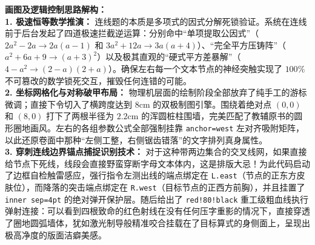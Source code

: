 \vspace{0.4cm}
{\small\color{blue!70!black}
\textbf{画图及逻辑控制思路解构：}\\
\textbf{1. 极速恒等数学推演：} 连线题的本质是多项式的因式分解死锁验证。系统在连线前于后台发起了四道极速拦截逆运算：分别命中“单项提取公因式”（$2a^2 - 2a \rightarrow 2a(a - 1)$ 和 $3a^2 + 12a \rightarrow 3a(a + 4)$）、“完全平方压铸阵”（$a^2 + 6a + 9 \rightarrow (a+3)^2$）以及极其直观的“硬式平方差暴解”（$4 - a^2 \rightarrow (2-a)(2+a)$）。确保左右每一个文本节点的神经突触实现了 $100\%$ 不可篡改的数学锁死交互，摧毁任何连错的可能。\\
\textbf{2. 坐标网格化与对称破甲布局：} 物理机层面的绘制阶段全部放弃了纯手工的游标微调；直接下令切入了横跨度达到 $8\mathrm{cm}$ 的双极制图引擎。围绕着绝对点 $(0,0)$ 和 $(8,0)$ 打下了两根半径为 $2.2\mathrm{cm}$ 的浑圆桩柱围墙，完美匹配了教辅原书的圆形圈地画风。左右的各组参数公式全部强制挂靠 \texttt{anchor=west} 左对齐吸附矩阵，以此还原卷面中那种“左侧工整，右侧锯齿错落”的文字排列真身属性。\\
\textbf{3. 穿刺连线边界锚点捕捉识别技术：} 对于这种带两边集合的交叉线网，如果直接给节点下死线，线段会直接野蛮穿断字母文本体内，这是排版大忌！为此代码启动了边框自检触雷感应，强行指令左测出线的端点绑定在 \texttt{L.east}（节点的正东方皮肤位），而降落的突击端点绑定在 \texttt{R.west}（目标节点的正西方前胸），并且挂置了 \texttt{inner sep=4pt} 的绝对弹开保护层。随后给出了 \texttt{red!80!black} 重工级粗血线执行弹射连接：可以看到四根致命的红色射线在没有任何压字重影的情况下，直接穿透了圈地圆弧墙体，犹如激光制导般精准咬合挂载在了目标算式的身侧面上，呈现出极高净度的版面洁癖美感。
}
\newpage


